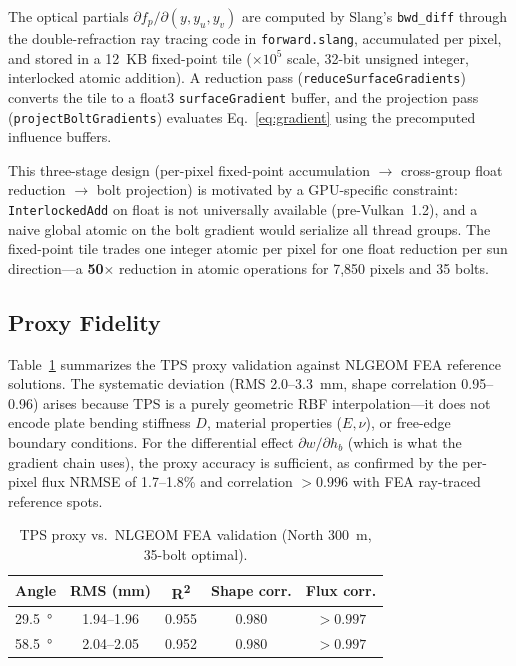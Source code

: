 \documentclass{CVM}
\begin{document}
The optical partials $\partial f_p / \partial(y, y_u, y_v)$ are computed by
Slang's \verb|bwd_diff| through the double-refraction ray tracing code in
\verb|forward.slang|, accumulated per pixel, and stored in a 12~KB
fixed-point tile ($\times 10^5$ scale, 32-bit unsigned integer, interlocked
atomic addition). A reduction pass (\verb|reduceSurfaceGradients|) converts
the tile to a float3 \verb|surfaceGradient| buffer, and the projection pass
(\verb|projectBoltGradients|) evaluates Eq.~\ref{eq:gradient} using the
precomputed influence buffers.

This three-stage design (per-pixel fixed-point accumulation $\rightarrow$
cross-group float reduction $\rightarrow$ bolt projection) is motivated by a
GPU-specific constraint: \verb|InterlockedAdd| on float is not universally
available (pre-Vulkan~1.2), and a naive global atomic on the bolt gradient
would serialize all thread groups. The fixed-point tile trades one integer
atomic per pixel for one float reduction per sun direction---a \textbf{50$\times$}
reduction in atomic operations for 7,850 pixels and 35 bolts.

\subsection{Proxy Fidelity}
\label{sec:proxy_fidelity}

Table~\ref{tab:proxy_fidelity} summarizes the TPS proxy validation against
NLGEOM FEA reference solutions. The systematic deviation (RMS 2.0--3.3~mm,
shape correlation 0.95--0.96) arises because TPS is a purely geometric RBF
interpolation---it does not encode plate bending stiffness $D$, material
properties ($E, \nu$), or free-edge boundary conditions. For the differential
effect $\partial w / \partial h_b$ (which is what the gradient chain uses),
the proxy accuracy is sufficient, as confirmed by the per-pixel flux NRMSE of
1.7--1.8\% and correlation $>0.996$ with FEA ray-traced reference spots.

\begin{table}[t]
\centering
\caption{TPS proxy vs.\ NLGEOM FEA validation (North \SI{300}{\meter}, 35-bolt optimal).}
\label{tab:proxy_fidelity}
\small
\begin{tabular}{lcccc}
\toprule
Angle & RMS (mm) & R\textsuperscript{2} & Shape corr. & Flux corr. \\
\midrule
\SI{29.5}{\degree} & 1.94--1.96 & 0.955 & 0.980 & $>0.997$ \\
\SI{58.5}{\degree} & 2.04--2.05 & 0.952 & 0.980 & $>0.997$ \\
\bottomrule
\end{tabular}
\end{table}
\end{document}
